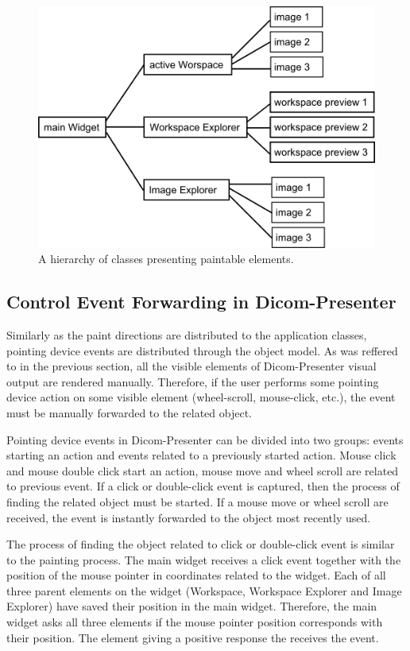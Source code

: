 \begin{figure}
	\caption{A hierarchy of classes presenting paintable elements.}
	\begin{center}
	\includegraphics[width=\textwidth]{Text/IMG/paint.png}
	\end{center}
	\label{hierarchy}
\end{figure}

\subsection{Control Event Forwarding in Dicom-Presenter}

Similarly as the paint directions are distributed to the application classes, pointing device events are distributed through the object model. As was reffered to in the previous section, all the visible elements of Dicom-Presenter visual output are rendered manually. Therefore, if the user performs some pointing device action on some visible element (wheel-scroll, mouse-click, etc.), the event must be manually forwarded to the related object.

Pointing device events in Dicom-Presenter can be divided into two groups: events starting an action and events related to a previously started action. Mouse click and mouse double click start an action, mouse move and wheel scroll are related to previous event. If a click or double-click event is captured, then the process of finding the related object must be started. If a mouse move or wheel scroll are received, the event is instantly forwarded to the object most recently used.

The process of finding the object related to click or double-click event is similar to the painting process. The main widget receives a click event together with the position of the mouse pointer in coordinates related to the widget. Each of all three parent elements on the widget (Workspace, Workspace Explorer and Image Explorer) have saved their position in the main widget. Therefore, the main widget asks all three elements if the mouse pointer position corresponds with their position. The element giving a positive response the receives the event.

